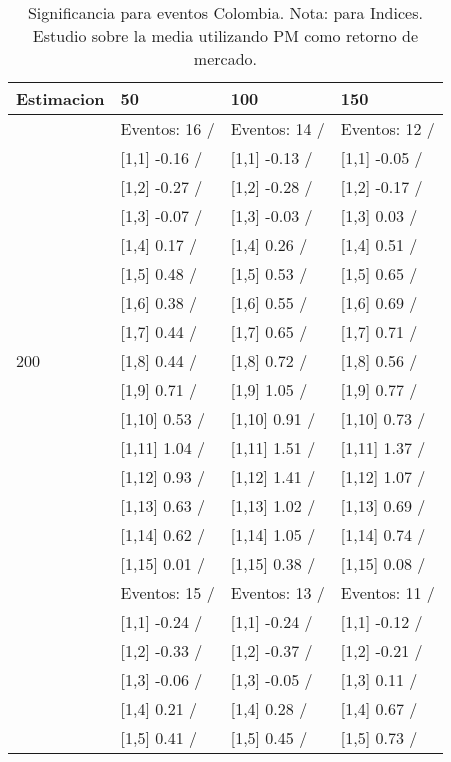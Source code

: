 \begin{table}

\caption{Significancia para eventos Colombia. Nota: para Indices. Estudio sobre la media utilizando PM como retorno de mercado.}
\centering
\begin{tabular}[t]{llll}
\toprule
Estimacion & 50 & 100 & 150\\
\midrule
 & Eventos:  16 / & Eventos:  14 / & Eventos:  12 /\\
 & {}[1,1] -0.16  / & {}[1,1] -0.13  / & {}[1,1] -0.05  /\\
 & {}[1,2] -0.27  / & {}[1,2] -0.28  / & {}[1,2] -0.17  /\\
 & {}[1,3] -0.07  / & {}[1,3] -0.03  / & {}[1,3] 0.03  /\\
 & {}[1,4] 0.17  / & {}[1,4] 0.26  / & {}[1,4] 0.51  /\\
\addlinespace
 & {}[1,5] 0.48  / & {}[1,5] 0.53  / & {}[1,5] 0.65  /\\
 & {}[1,6] 0.38  / & {}[1,6] 0.55  / & {}[1,6] 0.69  /\\
 & {}[1,7] 0.44  / & {}[1,7] 0.65  / & {}[1,7] 0.71  /\\
200 & {}[1,8] 0.44  / & {}[1,8] 0.72  / & {}[1,8] 0.56  /\\
 & {}[1,9] 0.71  / & {}[1,9] 1.05  / & {}[1,9] 0.77  /\\
\addlinespace
 & {}[1,10] 0.53  / & {}[1,10] 0.91  / & {}[1,10] 0.73  /\\
 & {}[1,11] 1.04  / & {}[1,11] 1.51  / & {}[1,11] 1.37  /\\
 & {}[1,12] 0.93  / & {}[1,12] 1.41  / & {}[1,12] 1.07  /\\
 & {}[1,13] 0.63  / & {}[1,13] 1.02  / & {}[1,13] 0.69  /\\
 & {}[1,14] 0.62  / & {}[1,14] 1.05  / & {}[1,14] 0.74  /\\
\addlinespace
 & {}[1,15] 0.01  / & {}[1,15] 0.38  / & {}[1,15] 0.08  /\\
 & Eventos:  15 / & Eventos:  13 / & Eventos:  11 /\\
 & {}[1,1] -0.24  / & {}[1,1] -0.24  / & {}[1,1] -0.12  /\\
 & {}[1,2] -0.33  / & {}[1,2] -0.37  / & {}[1,2] -0.21  /\\
 & {}[1,3] -0.06  / & {}[1,3] -0.05  / & {}[1,3] 0.11  /\\
\addlinespace
 & {}[1,4] 0.21  / & {}[1,4] 0.28  / & {}[1,4] 0.67  /\\
 & {}[1,5] 0.41  / & {}[1,5] 0.45  / & {}[1,5] 0.73  /\\

\end{tabular}
\end{table}
